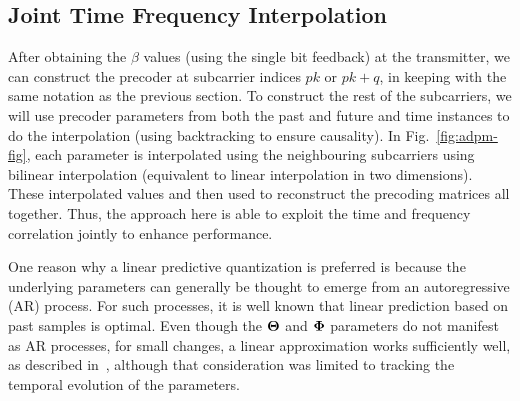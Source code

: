 \documentclass[journal,10pt,twocolumn]{IEEEtran}
\begin{document}
\subsection{Joint Time Frequency Interpolation}
\label{interp}
After obtaining the $\beta$ values (using the single bit feedback) at
the transmitter, we can construct the precoder at subcarrier indices
$pk$ or $pk+q$, in keeping with the same notation as the previous
section. To construct the rest of the subcarriers, we will use
precoder parameters from both the past and future and time instances
to do the interpolation (using backtracking to ensure causality). In
Fig.~\ref{fig:adpm-fig}, each parameter is interpolated using the
neighbouring subcarriers using bilinear interpolation (equivalent to
linear interpolation in two dimensions). These interpolated values and
then used to reconstruct the precoding matrices all together. Thus,
the approach here is able to exploit the time and frequency
correlation jointly to enhance performance.

One reason why a linear predictive quantization is preferred is
because the underlying parameters can generally be thought to emerge
from an autoregressive (AR) process. For such processes, it is well
known that linear prediction based on past samples is optimal. Even
though the $\bf{\Theta}$ and $\bf{\Phi}$ parameters do not manifest as AR
processes, for small changes, a linear approximation works
sufficiently well, as described in~\cite{4114278}, although that
consideration was limited to tracking the temporal evolution of the
parameters.
\end{document}
